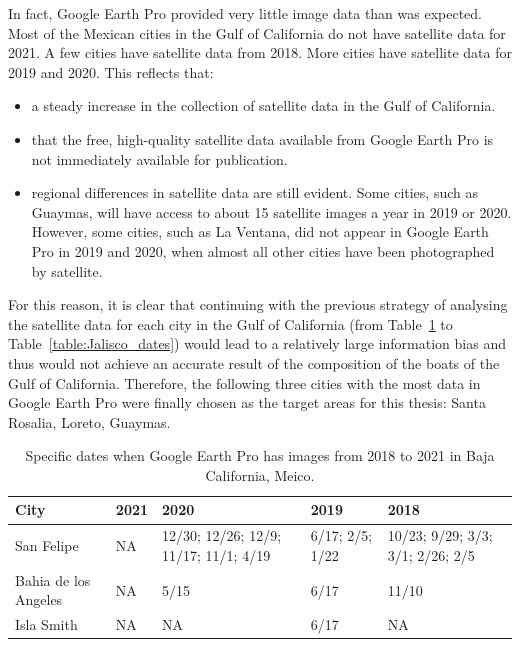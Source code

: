 In fact, Google Earth Pro provided very little image data than was expected. Most of the Mexican cities in the Gulf of California do not have satellite data for 2021. A few cities have satellite data from 2018. More cities have satellite data for 2019 and 2020. This reflects that:
\begin{itemize}
    \item a steady increase in the collection of satellite data in the Gulf of California.
    \item that the free, high-quality satellite data available from Google Earth Pro is not immediately available for publication.
    \item regional differences in satellite data are still evident. Some cities, such as Guaymas, will have access to about 15 satellite images a year in 2019 or 2020. However, some cities, such as La Ventana, did not appear in Google Earth Pro in 2019 and 2020, when almost all other cities have been photographed by satellite.\\
\end{itemize}

For this reason, it is clear that continuing with the previous strategy of analysing the satellite data for each city in the Gulf of California (from Table~\ref{table:baja_california_dates} to Table~\ref{table:Jalisco_dates}) would lead to a relatively large information bias and thus would not achieve an accurate result of the composition of the boats of the Gulf of California. Therefore, the following three cities with the most data in Google Earth Pro were finally chosen as the target areas for this thesis: Santa Rosalia, Loreto, Guaymas.\\

\begin{table}[h!]
\centering
\begin{tabular}{ l | p{2.5cm} | p{2.5cm} | p{2.5cm} | p{2.5cm} }
\toprule
City & 2021 & 2020 & 2019 & 2018 \\
\midrule
San Felipe & NA & 12/30; 12/26; 12/9; 11/17; 11/1; 4/19 & 6/17; 2/5; 1/22 & 10/23; 9/29; 3/3; 3/1; 2/26; 2/5\\
\midrule
Bahia de los Angeles & NA & 5/15 & 6/17 & 11/10\\
\midrule
Isla Smith & NA & NA & 6/17 & NA\\
\bottomrule
\end{tabular}
\caption{Specific dates when Google Earth Pro has images from 2018 to 2021 in Baja California, Meico.}
\label{table:baja_california_dates}
\end{table}


